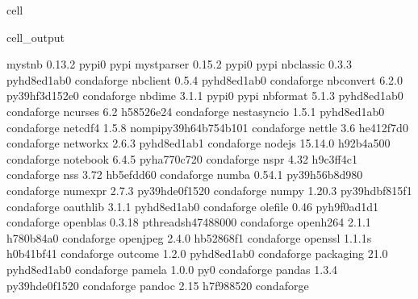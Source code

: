\documentclass[letterpaper,table,10pt,english]{jupyterBook}
\begin{document}
\begin{sphinxuseclass}{cell}
\begin{sphinxVerbatimOutput}
\begin{sphinxuseclass}{cell_output}
\begin{sphinxVerbatim}[commandchars=\\\{\}]
myst\PYGZhy{}nb                   0.13.2                   pypi\PYGZus{}0    pypi
myst\PYGZhy{}parser               0.15.2                   pypi\PYGZus{}0    pypi
nbclassic                 0.3.3              pyhd8ed1ab\PYGZus{}0    conda\PYGZhy{}forge
nbclient                  0.5.4              pyhd8ed1ab\PYGZus{}0    conda\PYGZhy{}forge
nbconvert                 6.2.0            py39hf3d152e\PYGZus{}0    conda\PYGZhy{}forge
nbdime                    3.1.1                    pypi\PYGZus{}0    pypi
nbformat                  5.1.3              pyhd8ed1ab\PYGZus{}0    conda\PYGZhy{}forge
ncurses                   6.2                  h58526e2\PYGZus{}4    conda\PYGZhy{}forge
nest\PYGZhy{}asyncio              1.5.1              pyhd8ed1ab\PYGZus{}0    conda\PYGZhy{}forge
netcdf4                   1.5.8           nompi\PYGZus{}py39h64b754b\PYGZus{}101    conda\PYGZhy{}forge
nettle                    3.6                  he412f7d\PYGZus{}0    conda\PYGZhy{}forge
networkx                  2.6.3              pyhd8ed1ab\PYGZus{}1    conda\PYGZhy{}forge
nodejs                    15.14.0              h92b4a50\PYGZus{}0    conda\PYGZhy{}forge
notebook                  6.4.5              pyha770c72\PYGZus{}0    conda\PYGZhy{}forge
nspr                      4.32                 h9c3ff4c\PYGZus{}1    conda\PYGZhy{}forge
nss                       3.72                 hb5efdd6\PYGZus{}0    conda\PYGZhy{}forge
numba                     0.54.1           py39h56b8d98\PYGZus{}0    conda\PYGZhy{}forge
numexpr                   2.7.3            py39hde0f152\PYGZus{}0    conda\PYGZhy{}forge
numpy                     1.20.3           py39hdbf815f\PYGZus{}1    conda\PYGZhy{}forge
oauthlib                  3.1.1              pyhd8ed1ab\PYGZus{}0    conda\PYGZhy{}forge
olefile                   0.46               pyh9f0ad1d\PYGZus{}1    conda\PYGZhy{}forge
openblas                  0.3.18          pthreads\PYGZus{}h4748800\PYGZus{}0    conda\PYGZhy{}forge
openh264                  2.1.1                h780b84a\PYGZus{}0    conda\PYGZhy{}forge
openjpeg                  2.4.0                hb52868f\PYGZus{}1    conda\PYGZhy{}forge
openssl                   1.1.1s               h0b41bf4\PYGZus{}1    conda\PYGZhy{}forge
outcome                   1.2.0              pyhd8ed1ab\PYGZus{}0    conda\PYGZhy{}forge
packaging                 21.0               pyhd8ed1ab\PYGZus{}0    conda\PYGZhy{}forge
pamela                    1.0.0                      py\PYGZus{}0    conda\PYGZhy{}forge
pandas                    1.3.4            py39hde0f152\PYGZus{}0    conda\PYGZhy{}forge
pandoc                    2.15                 h7f98852\PYGZus{}0    conda\PYGZhy{}forge

\end{sphinxVerbatim}
\end{sphinxuseclass}
\end{sphinxVerbatimOutput}
\end{sphinxuseclass}
\end{document}
